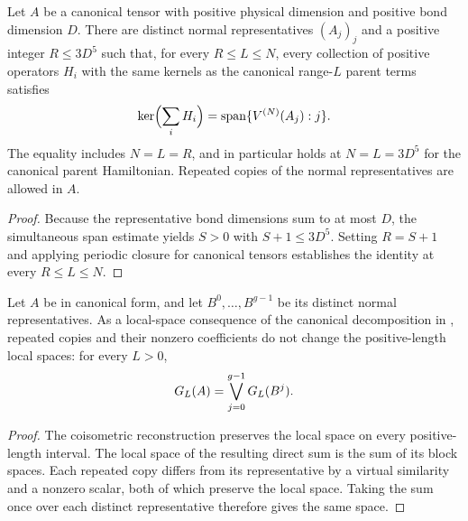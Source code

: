 \begin{lemma}
    \label{thm:canonical_bounded_range_ground_space}
    \leanok
    Let $A$ be a canonical tensor with positive physical dimension and
    positive bond dimension $D$. There are distinct normal representatives
    $(A_j)_j$ and a positive integer $R\leq3D^5$ such that, for every
    $R\leq L\leq N$, every collection of positive operators $H_i$ with the
    same kernels as the canonical range-$L$ parent terms satisfies
    \[
        \ker\Bigl(\sum_iH_i\Bigr)
        =\operatorname{span}\{V^{(N)}(A_j):j\}.
    \]
    The equality includes $N=L=R$, and in particular holds at
    $N=L=3D^5$ for the canonical parent Hamiltonian. Repeated copies of
    the normal representatives are allowed in $A$.
\end{lemma}

\begin{proof}
    \leanok
    Because the representative bond dimensions sum to at most $D$, the
    simultaneous span estimate yields $S>0$ with $S+1\leq3D^5$. Setting
    $R=S+1$ and applying periodic closure for canonical tensors establishes the
    identity at every $R\leq L\leq N$.
\end{proof}

\begin{lemma}
    \label{thm:ph_canonical_representative_local_spaces}
    \leanok
    Let $A$ be in canonical form, and let $B^0,\ldots,B^{g-1}$ be its distinct
    normal representatives. As a local-space consequence of the canonical
    decomposition in \cite{Cirac2021Matrix}, repeated copies and their nonzero
    coefficients do not change the positive-length local spaces: for every
    $L>0$,
    \begin{align}
        G_L(A)=\bigvee_{j=0}^{g-1}G_L(B^j).
        \notag
    \end{align}
\end{lemma}
\begin{proof}
    \leanok
    The coisometric reconstruction preserves the local space on every
    positive-length interval. The local space of the resulting direct sum
    is the sum of its block spaces. Each repeated copy differs from its
    representative by a virtual similarity and a nonzero scalar, both of
    which preserve the local space. Taking the sum once over each distinct
    representative therefore gives the same space.
\end{proof}


